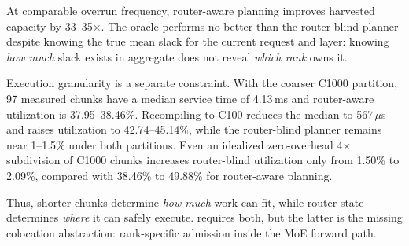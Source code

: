 At comparable overrun frequency, router-aware planning improves harvested
capacity by 33--35$\times$. The oracle performs no better than the
router-blind planner despite knowing the true mean slack for the current
request and layer: knowing \emph{how much} slack exists in aggregate does
not reveal \emph{which rank} owns it.

Execution granularity is a separate constraint. With the coarser C1000
partition, 97 measured chunks have a median service time of 4.13\,ms and
router-aware utilization is 37.95--38.46\%. Recompiling to C100 reduces
the median to 567\,$\mu$s and raises utilization to 42.74--45.14\%,
while the router-blind planner remains near 1--1.5\% under both
partitions. Even an idealized zero-overhead 4$\times$ subdivision of
C1000 chunks increases router-blind utilization only from 1.50\% to
2.09\%, compared with 38.46\% to 49.88\% for router-aware planning.

Thus, shorter chunks determine \emph{how much} work can fit, while router
state determines \emph{where} it can safely execute. \sys{} requires
both, but the latter is the missing colocation abstraction: rank-specific
admission inside the \ac{MoE} forward path.
